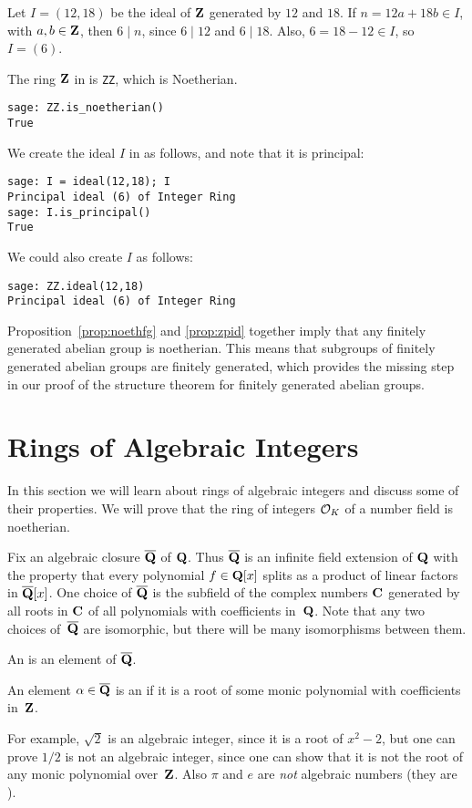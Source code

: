 \begin{example}
Let $I=(12,18)$ be the ideal of $\mathbf{Z}$ generated by $12$ and $18$.
If $n=12a+18b\in I$, with $a,b\in\mathbf{Z}$, 
then $6\mid n$, since $6\mid 12$ and $6\mid 18$.
Also, $6=18-12\in I$, so $I=(6)$.

The ring $\mathbf{Z}$
in \sage{} is {\tt ZZ}, which is Noetherian.
\begin{verbatim}
sage: ZZ.is_noetherian()
True
\end{verbatim}
We create the ideal $I$ in \sage{} as follows, and note that
it is principal:
\begin{verbatim}
sage: I = ideal(12,18); I
Principal ideal (6) of Integer Ring
sage: I.is_principal()
True
\end{verbatim}
We could also create $I$ as follows:
\begin{verbatim}
sage: ZZ.ideal(12,18)
Principal ideal (6) of Integer Ring
\end{verbatim}
\end{example}

Proposition~\ref{prop:noethfg} and \ref{prop:zpid} together imply that
any finitely generated abelian group is noetherian.  This means that
subgroups of finitely generated abelian groups are finitely generated,
which provides the missing step in our proof of the structure theorem
for finitely generated abelian groups.

\section{Rings of Algebraic Integers}
In this section we will learn about rings of algebraic integers and
discuss some of their properties.  We will prove that the ring of
integers $\mathcal{O}_K$ of a number field is noetherian.

Fix an algebraic closure $\overline{\mathbf{Q}}$ of $\mathbf{Q}$.  Thus $\overline{\mathbf{Q}}$ is an infinite
field extension of $\mathbf{Q}$ with the property that every polynomial
$f\in\mathbf{Q}[x]$ splits as a product of linear factors in $\overline{\mathbf{Q}}[x]$.  One
choice of $\overline{\mathbf{Q}}$ is the subfield of the complex numbers $\mathbf{C}$
generated by all roots in $\mathbf{C}$ of all polynomials with coefficients 
in~$\mathbf{Q}$.  Note that any two choices of~$\overline{\mathbf{Q}}$ are isomorphic, but there will
be many isomorphisms between them.   

An  is an element of $\overline{\mathbf{Q}}$.

\begin{definition}
An element $\alpha\in\overline{\mathbf{Q}}$ is an  if it is a
root of some monic polynomial with coefficients in~$\mathbf{Z}$.
\end{definition}
For example, $\sqrt{2}$ is an algebraic integer, since it is a root
of $x^2-2$, but one can prove
$1/2$ is not an algebraic integer, since one can show that
it is not the root of any monic polynomial over~$\mathbf{Z}$.
Also $\pi$ and $e$ are {\em not} algebraic numbers (they are 
).    

